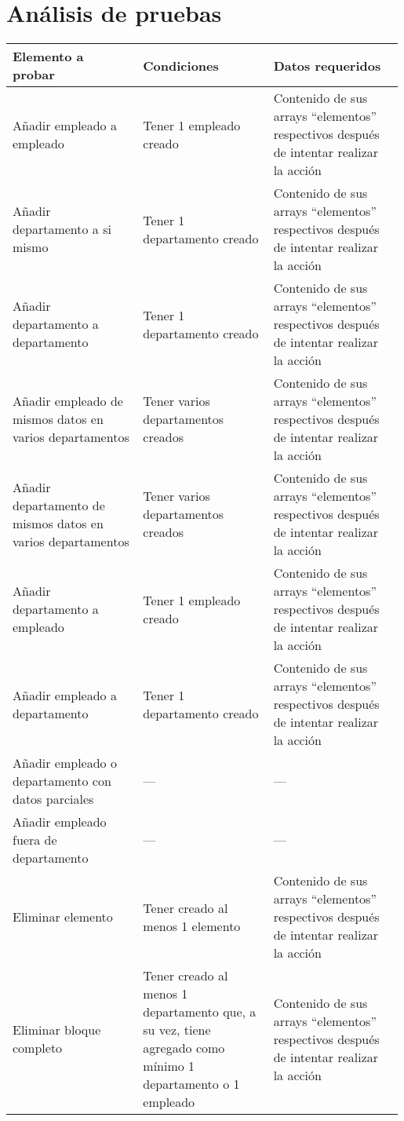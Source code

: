 \documentclass{article}
\begin{document}
\section{Análisis de pruebas}


\begin{table}
    \centering
    \begin{tabular}{|>{\raggedright\arraybackslash}p{0.33\linewidth}|>{\raggedright\arraybackslash}p{0.33\linewidth}|>{\raggedright\arraybackslash}p{0.33\linewidth}|} \hline 
        \textbf{Elemento a probar} & \textbf{Condiciones} & \textbf{Datos requeridos}\\ \hline 
        Añadir empleado a empleado &  Tener 1 empleado creado& Contenido de sus arrays “elementos” respectivos después de intentar realizar la acción\\ \hline
        Añadir departamento a si mismo &  Tener 1 departamento creado& Contenido de sus arrays “elementos” respectivos después de intentar realizar la acción\\ \hline 
        Añadir departamento a departamento &  Tener 1 departamento creado& Contenido de sus arrays “elementos” respectivos después de intentar realizar la acción\\ \hline 
        Añadir empleado de mismos datos en varios departamentos &  Tener varios departamentos creados& Contenido de sus arrays “elementos” respectivos después de intentar realizar la acción\\ \hline 
        Añadir departamento de mismos datos en varios departamentos &  Tener varios departamentos creados& Contenido de sus arrays “elementos” respectivos después de intentar realizar la acción\\ \hline 
        Añadir departamento a empleado &  Tener 1 empleado creado& Contenido de sus arrays “elementos” respectivos después de intentar realizar la acción\\ \hline 
        Añadir empleado a departamento &  Tener 1 departamento creado& Contenido de sus arrays “elementos” respectivos después de intentar realizar la acción\\ \hline 
        Añadir empleado o departamento con datos parciales &  ---& ---\\ \hline 
        Añadir empleado fuera de departamento &  ---& ---\\ \hline 
        Eliminar elemento &  Tener creado al menos 1 elemento& Contenido de sus arrays “elementos” respectivos después de intentar realizar la acción\\ \hline 
        Eliminar bloque completo &  Tener creado al menos 1 departamento que, a su vez, tiene agregado como mínimo 1 departamento o 1 empleado& Contenido de sus arrays “elementos” respectivos después de intentar realizar la acción\\ \hline 

\end{tabular}
\end{table}
\end{document}
